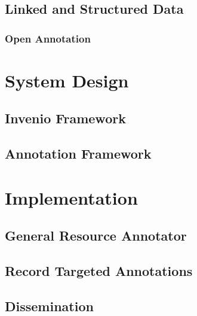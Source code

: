 \documentclass[12pt,a4paper,twoside]{report}
\begin{document}
    \subsection{Linked and Structured Data}
      \label{sec:data}
      

      \subsubsection{Open Annotation}
        \label{sec:oa}
        

  \clearpage

  \section{System Design}
    \label{sec:design}
    

    \subsection{Invenio Framework}
      \label{sec:v2}
      

    \subsection{Annotation Framework}
      \label{sec:anno}
      

  \clearpage

  \section{Implementation}
    \label{sec:impl}
    

    \subsection{General Resource Annotator}
      \label{sec:gra}
      

    \subsection{Record Targeted Annotations}
      \label{sec:notes}
      

    \subsection{Dissemination}
      \label{sec:diss}
      
\end{document}
